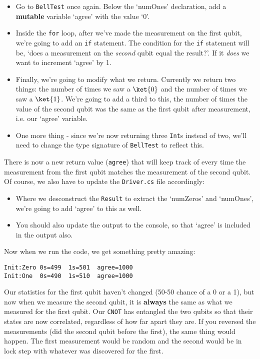 \documentclass[a4paper]{article}
\begin{document}
\begin{itemize}
\item Go to \verb$BellTest$ once again. Below the `numOnes' declaration, add a \textbf{mutable} variable `agree' with the value `0'.
\item Inside the \verb$for$ loop, after we've made the measurement on the first qubit, we're going to add an \verb$if$ statement. The condition for the \verb$if$ statement will be, `does a measurement on the \textit{second} qubit equal the result?'. If it \textit{does} we want to increment `agree' by 1.
\item Finally, we're going to modify what we return. Currently we return two things: the number of times we saw a $\ket{0}$ and the number of times we saw a $\ket{1}$. We're going to add a third to this, the number of times the value of the second qubit was the same as the first qubit after measurement, i.e. our `agree' variable. 
\item One more thing - since we're now returning three \verb$Int$s instead of two, we'll need to change the type signature of \verb$BellTest$ to reflect this. 
\end{itemize}

There is now a new return value (\verb$agree$) that will keep track of every time the measurement from the first qubit matches the measurement of the second qubit. Of course, we also have to update the \verb$Driver.cs$ file accordingly:
\begin{itemize}
\item Where we desconstruct the \verb$Result$ to extract the `numZeros' and `numOnes', we're going to add `agree' to this as well. 
\item You should also update the output to the console, so that `agree' is included in the output also. 
\end{itemize}

Now when we run the code, we get something pretty amazing:

\begin{lstlisting}
Init:Zero 0s=499  1s=501  agree=1000
Init:One  0s=490  1s=510  agree=1000
\end{lstlisting}

Our statistics for the first qubit haven't changed (50-50 chance of a 0 or a 1), but now when we measure the second qubit, it is \textbf{always} the same as what we measured for the first qubit. Our \verb$CNOT$ has entangled the two qubits so that their states are now correlated, regardless of how far apart they are. If you reversed the measurements (did the second qubit before the first), the same thing would happen. The first measurement would be random and the second would be in lock step with whatever was discovered for the first.
\end{document}
